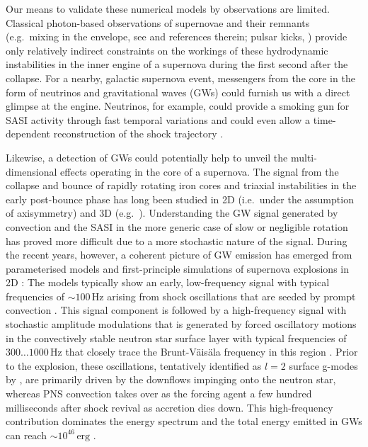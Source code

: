Our means to validate these numerical models by observations are
limited. Classical photon-based observations of supernovae and their
remnants (e.g.\ mixing in the envelope, see
\citealp{wongwathanarat_15} and references therein; pulsar kicks,
\citealp{scheck_06,wongwathanarat_10b,wongwathanarat_13,nordhaus_12}) provide only
relatively indirect constraints on the workings of these hydrodynamic
instabilities in the inner engine of a supernova during the first
second after the collapse.  For a nearby, galactic supernova event,
messengers from the core in the form of neutrinos and gravitational waves (GWs) 
could furnish us with a direct glimpse at the engine. Neutrinos,
for example, could provide a smoking gun for SASI activity through
fast temporal variations \citep{marek_08,lund_10,brandt_11,tamborra_13,tamborra_14b,mueller_14} and
could even allow a time-dependent reconstruction of the shock trajectory
\citep{mueller_14}.

Likewise, a detection of GWs could potentially help to
unveil the multi-dimensional effects operating in the core of a
supernova. The signal from the collapse and bounce of rapidly rotating
iron cores and triaxial instabilities in the early post-bounce phase
has long been studied in 2D (i.e.\ under the assumption of
axisymmetry) and 3D
(e.g.\ \citealp{ott_06_a,dimmelmeier_07_a,dimmelmeier_08,scheidegger_08,abdikamalov_10}). Understanding
the GW signal generated by convection and the SASI in
the more generic case of slow or negligible rotation has proved more
difficult due to a more stochastic nature of the signal. During the
recent years, however, a coherent picture of GW
emission has emerged from parameterised models \citep{murphy_09} and
first-principle simulations of supernova explosions in 2D
\citep{marek_08,mueller_13}: The models typically show an early,
low-frequency signal with typical frequencies of $\mathord{\sim} 100
\,\mathrm{Hz}$ arising from shock oscillations that are seeded by
prompt convection
\citep{marek_08,murphy_09,yakunin_10,mueller_13,yakunin_15}. This
signal component is followed by a high-frequency signal with stochastic
amplitude modulations that is generated by forced oscillatory motions
in the convectively stable neutron star surface layer
\citep{marek_08,murphy_09,mueller_13} with typical frequencies of $300
\ldots 1000 \,\mathrm{Hz}$  that closely trace the
Brunt-V\"ais\"ala frequency in this region \citep{mueller_13}. Prior
to the explosion, these oscillations, tentatively identified as $l=2$
surface g-modes by \citet{mueller_13}, are primarily driven by the
downflows impinging onto the neutron star, whereas PNS
convection takes over as the forcing agent a few hundred
milliseconds after shock revival as accretion dies down.  This
high-frequency contribution dominates the energy spectrum and the
total energy emitted in GWs can reach
$\mathord{\sim} 10^{46} \,\mathrm{erg}$ \citep{mueller_13,yakunin_15}.

